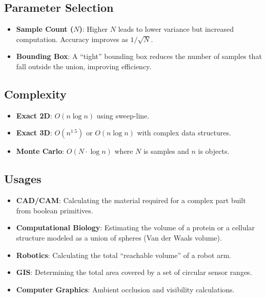 \subsection{Parameter Selection}
\begin{itemize}
    \item \textbf{Sample Count ($N$)}: Higher $N$ leads to lower variance but increased computation. Accuracy improves as $1/\sqrt{N}$.
    \item \textbf{Bounding Box}: A ``tight'' bounding box reduces the number of samples that fall outside the union, improving efficiency.
\end{itemize}

\subsection{Complexity}
\begin{itemize}
    \item \textbf{Exact 2D}: $O(n \log n)$ using sweep-line.
    \item \textbf{Exact 3D}: $O(n^{1.5})$ or $O(n \log n)$ with complex data structures.
    \item \textbf{Monte Carlo}: $O(N \cdot \log n)$ where $N$ is samples and $n$ is objects.
\end{itemize}

\subsection{Usages}
\begin{itemize}
    \item \textbf{CAD/CAM}: Calculating the material required for a complex part built from boolean primitives.
    \item \textbf{Computational Biology}: Estimating the volume of a protein or a cellular structure modeled as a union of spheres (Van der Waals volume).
    \item \textbf{Robotics}: Calculating the total ``reachable volume'' of a robot arm.
    \item \textbf{GIS}: Determining the total area covered by a set of circular sensor ranges.
    \item \textbf{Computer Graphics}: Ambient occlusion and visibility calculations.
\end{itemize}

